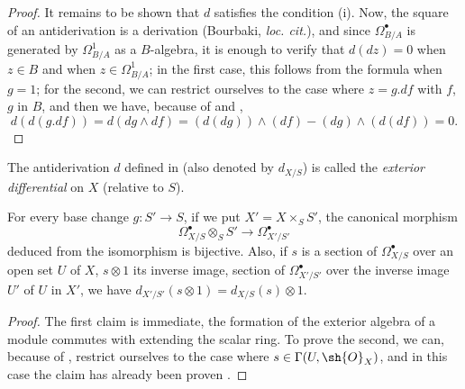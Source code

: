 \begin{proof}
It remains to be shown that $d$ satisfies the condition \rm{(i)}.
Now, the square of an antiderivation is a derivation (Bourbaki, \emph{loc. cit.}), and since $\Omega_{B/A}^\bullet$ is generated by $\Omega_{B/A}^1$ as a $B$-algebra, it is enough to verify that $d(dz) = 0$ when $z \in B$ and when $z \in \Omega_{B/A}^1$;
in the first case, this follows from the formula  when $g = 1$;
for the second, we can restrict ourselves to the case where $z = g.df$ with $f$, $g$ in $B$, and then we have, because of  and , 
\[
  d(d(g.df)) = d(dg \wedge df) = (d(dg)) \wedge (df) - (dg) \wedge (d(df)) = 0.
\] 
\end{proof}

\begin{definition}[16.6.3]
\label{IV.16.6.3}
The antiderivation $d$ defined in  (also denoted by $d_{X/S}$) is called the \emph{exterior differential} on $X$ (relative to $S$). 
\end{definition}

\begin{proposition}[16.6.4]
\label{IV.16.6.4}
For every base change $g:S' \to S$, if we put $X' = X \times_S S'$, the canonical morphism
\[
  \label{IV.16.6.4.1}
  \Omega_{X/S}^\bullet \otimes_S S' \to \Omega_{X'/S'}^\bullet
  \tag{16.6.4.1}
\]
deduced from the isomorphism  is bijective.
Also, if $s$ is a section of $\Omega_{X/S}^\bullet$ over an open set $U$ of $X$, $s \otimes 1$ its inverse image, section of $\Omega_{X'/S'}^\bullet$ over the inverse image $U'$ of $U$ in $X'$, we have $d_{X'/S'}(s \otimes 1) = d_{X/S}(s) \otimes 1$.
\end{proposition}

\begin{proof}
The first claim is immediate, the formation of the exterior algebra of a module commutes with extending the scalar ring.
To prove the second, we can, because of , restrict ourselves to the case where $s \in \Gamma(U, \sh{O}_X)$, and in this case the claim has already been proven .
\end{proof}

